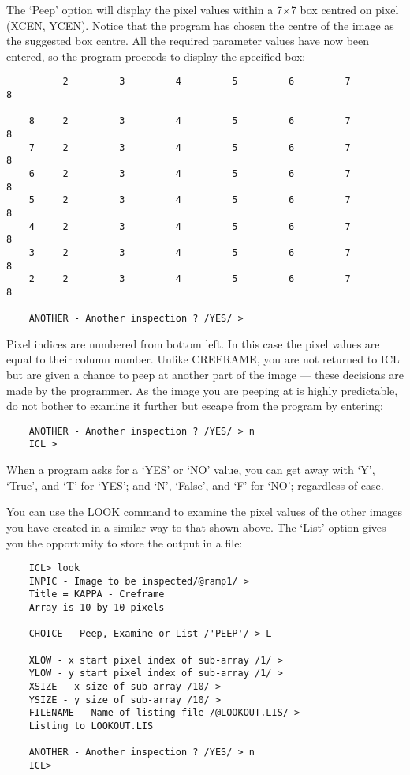 The `Peep' option will display the pixel values within a 7$\times$7 box centred
on pixel (XCEN, YCEN).
Notice that the program has chosen the centre of the image as the suggested box
centre.
All the required parameter values have now been entered, so the program proceeds
to display the specified box:

\begin{small}
\begin{verbatim}
          2         3         4         5         6         7         8

    8     2         3         4         5         6         7         8
    7     2         3         4         5         6         7         8
    6     2         3         4         5         6         7         8
    5     2         3         4         5         6         7         8
    4     2         3         4         5         6         7         8
    3     2         3         4         5         6         7         8
    2     2         3         4         5         6         7         8

    ANOTHER - Another inspection ? /YES/ >
\end{verbatim}
\end{small}

Pixel indices are numbered from bottom left.
In this case the pixel values are equal to their column number.
Unlike CREFRAME, you are not returned to ICL but are given a chance to peep
at another part of the image --- these decisions are made by the programmer.
As the image you are peeping at is highly predictable, do not bother to
examine it further but escape from the program by entering:

\begin{small}
\begin{verbatim}
    ANOTHER - Another inspection ? /YES/ > n
    ICL >
\end{verbatim}
\end{small}

When a program asks for a `YES' or `NO' value, you can get away with
`Y', `True', and `T' for `YES'; and `N', `False', and `F' for `NO'; regardless
of case.

You can use the LOOK command to examine the pixel values of the other images
you have created in a similar way to that shown above.
The `List' option gives you the opportunity to store the output in a file:

\begin{small}
\begin{verbatim}
    ICL> look
    INPIC - Image to be inspected/@ramp1/ >
    Title = KAPPA - Creframe
    Array is 10 by 10 pixels

    CHOICE - Peep, Examine or List /'PEEP'/ > L

    XLOW - x start pixel index of sub-array /1/ >
    YLOW - y start pixel index of sub-array /1/ >
    XSIZE - x size of sub-array /10/ >
    YSIZE - y size of sub-array /10/ >
    FILENAME - Name of listing file /@LOOKOUT.LIS/ >
    Listing to LOOKOUT.LIS

    ANOTHER - Another inspection ? /YES/ > n
    ICL>
\end{verbatim}
\end{small}

